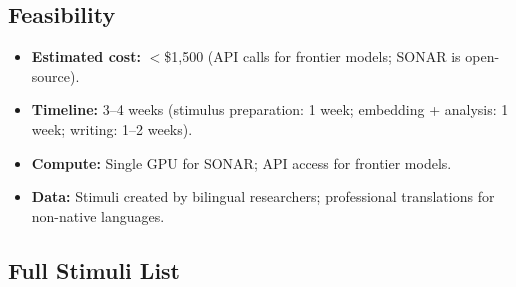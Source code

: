 \documentclass{article}
\theoremstyle{definition}
\begin{document}
\subsection{Feasibility}

\begin{itemize}[nosep]
  \item \textbf{Estimated cost:} $<$\$1{,}500 (API calls for frontier models; SONAR is open-source).
  \item \textbf{Timeline:} 3--4 weeks (stimulus preparation: 1 week; embedding + analysis: 1 week; writing: 1--2 weeks).
  \item \textbf{Compute:} Single GPU for SONAR; API access for frontier models.
  \item \textbf{Data:} Stimuli created by bilingual researchers; professional translations for non-native languages.
\end{itemize}

\subsection{Full Stimuli List}
\end{document}
